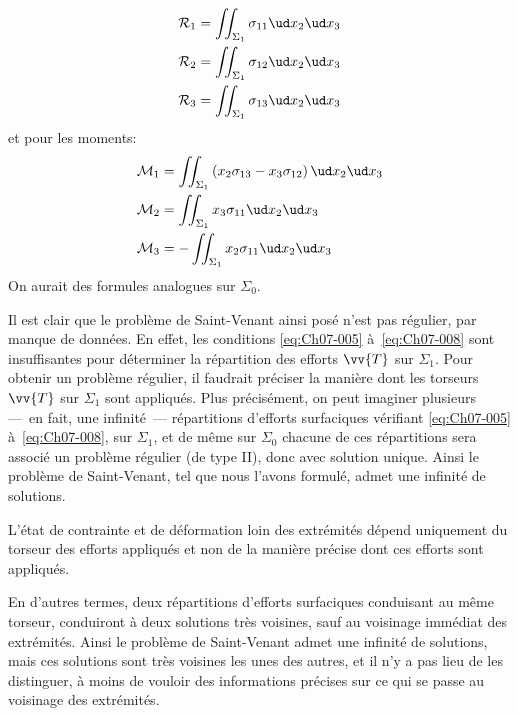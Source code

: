\begin{subequations}
\begin{align}
    \mathcal{R}_1 &= \iint_{\Sigma_1} \sigma_{11} \ud x_2 \ud x_3    \label{eq:Ch07-005} \\
        \mathcal{R}_2 &= \iint_{\Sigma_1} \sigma_{12} \ud x_2 \ud x_3 \label{eq:Ch07-005b} \\
        \mathcal{R}_3 &= \iint_{\Sigma_1} \sigma_{13} \ud x_2 \ud x_3  \label{eq:Ch07-006}
\end{align}
\end{subequations}
et pour les moments:
\begin{subequations}
\begin{align}
    \mathcal{M}_1 &= \iint_{\Sigma_1} \left( x_2\sigma_{13} - x_3\sigma_{12} \right) \ud x_2 \ud x_3 \label{eq:Ch07-007}\\
        \mathcal{M}_2 &= \iint_{\Sigma_1} x_3\sigma_{11} \ud x_2 \ud x_3 \label{eq:Ch07-007b}\\
        \mathcal{M}_3 &= -\iint_{\Sigma_1} x_2\sigma_{11} \ud x_2 \ud x_3 \label{eq:Ch07-008}
\end{align}
\end{subequations}
On aurait des formules analogues sur $\Sigma_0$.

Il est clair que le problème de Saint-Venant ainsi posé n'est pas régulier, par manque de données.
En effet, les conditions \eqref{eq:Ch07-005} à~\eqref{eq:Ch07-008} sont insuffisantes pour déterminer la répartition des efforts $\vv{T}$ sur $\Sigma_1$.
Pour obtenir un problème régulier, il faudrait préciser la manière dont les torseurs $\vv{T}$ sur $\Sigma_1$ sont appliqués.
Plus précisément, on peut imaginer plusieurs ---~en fait, une infinité~--- répartitions d'efforts surfaciques vérifiant \eqref{eq:Ch07-005} à~\eqref{eq:Ch07-008}, sur $\Sigma_1$, et de même sur $\Sigma_0$ chacune de ces répartitions sera associé un problème régulier (de type II), donc avec solution unique.
Ainsi le problème de Saint-Venant, tel que nous l'avons formulé, admet une infinité de solutions.

\begin{Principe}
    L'état de contrainte et de déformation loin des extrémités dépend uniquement du torseur des efforts appliqués et non de la manière précise dont ces efforts sont appliqués.
\end{Principe}

En d'autres termes, deux répartitions d'efforts surfaciques conduisant au même torseur, conduiront à deux solutions très voisines, sauf au voisinage immédiat des extrémités.
Ainsi le problème de Saint-Venant admet une infinité de solutions, mais ces solutions sont très voisines les unes des autres, et il n'y a pas lieu de les distinguer, à moins de vouloir des informations précises sur ce qui se passe au voisinage des extrémités.

